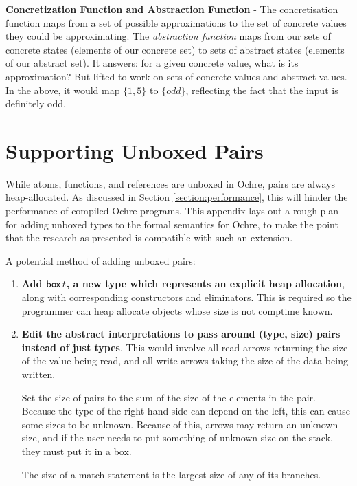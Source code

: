 \documentclass[12pt,twoside]{report}
\begin{document}
\textbf{Concretization Function and Abstraction Function} - The concretisation function maps from a set of possible approximations to the set of concrete values they could be approximating. The \textit{abstraction function} maps from our sets of concrete states (elements of our concrete set) to sets of abstract states (elements of our abstract set). It answers: for a given concrete value, what is its approximation? But lifted to work on sets of concrete values and abstract values. In the above, it would map $\{1, 5\}$ to $\{ odd \}$, reflecting the fact that the input is definitely odd.

\section{Supporting Unboxed Pairs}
\label{appendix:unbox}
While atoms, functions, and references are unboxed in Ochre, pairs are always heap-allocated. As discussed in Section \ref{section:performance}, this will hinder the performance of compiled Ochre programs. This appendix lays out a rough plan for adding unboxed types to the formal semantics for Ochre, to make the point that the research as presented is compatible with such an extension.

A potential method of adding unboxed pairs:

\begin{enumerate}
  \item \textbf{Add $\mathsf{box} \, t$, a new type which represents an explicit heap allocation}, along with corresponding constructors and eliminators. This is required so the programmer can heap allocate objects whose size is not comptime known.
  \item \textbf{Edit the abstract interpretations to pass around (type, size) pairs instead of just types}. This would involve all read arrows returning the size of the value being read, and all write arrows taking the size of the data being written.
  
  Set the size of pairs to the sum of the size of the elements in the pair. Because the type of the right-hand side can depend on the left, this can cause some sizes to be unknown. Because of this, arrows may return an unknown size, and if the user needs to put something of unknown size on the stack, they must put it in a box.

  The size of a match statement is the largest size of any of its branches.
\end{enumerate}

\end{document}
